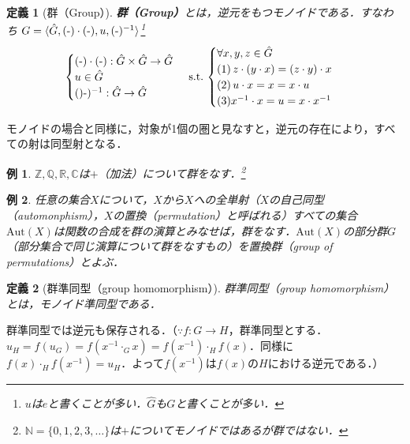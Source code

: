 \documentclass[dvipdfmx,a4j,10pt]{jsarticle}
\theoremstyle{mystyle1}
\theoremstyle{mystyle2}
\newtheorem{dfn*}{定義}
\newtheorem{example}{例}
\begin{document}
\begin{dfn*}[群（Group）]
    \textbf{群（Group）}とは，逆元をもつモノイドである．すなわち
    $G=\langle \hat{G},(\mathchar`-)\cdot (\mathchar`-),u,(\mathchar`-)^{-1} \rangle$\footnote{$u$は$e$と書くことが多い．$\hat G$も$G$と書くことが多い．}\\
    \[
        \begin{cases}
            (\mathchar`-)\cdot(\mathchar`-):\hat{G}\times\hat{G}\to\hat{G} \\
            u\in\hat{G}                                                    \\
            ()\mathchar`-)^{-1}:\hat{G}\to\hat{G}
        \end{cases}\,\textrm{s.t.}\,
        \begin{cases}
            \forall x,y,z\in\hat{G}                          \\
            \textrm{(1)}\,z\cdot(y\cdot x)=(z\cdot y)\cdot x \\
            \textrm{(2)}\, u\cdot x=x=x\cdot u               \\
            \textrm{(3)} x^{-1}\cdot x=u=x\cdot x^{-1}
        \end{cases}
    \]
\end{dfn*}

モノイドの場合と同様に，対象が1個の圏と見なすと，逆元の存在により，すべての射は同型射となる．

\begin{example}
    $\mathbb{Z},\mathbb{Q},\mathbb{R},\mathbb{C}$は$+$（加法）について群をなす．\footnote{$\mathbb{N}=\{0,1,2,3,\ldots\}$は$+$についてモノイドではあるが群ではない．}
\end{example}

\begin{example}
    任意の集合$X$について，$X$から$X$への全単射（$X$の自己同型（automonphism），$X$の置換（permutation）と呼ばれる）すべての集合$\mathrm{Aut}(X)$は関数の合成を群の演算とみなせば，群をなす．$\mathrm{Aut}(X)$の部分群$G$（部分集合で同じ演算について群をなすもの）を置換群（group of permutations）とよぶ．
\end{example}

\begin{dfn*}[群準同型（group homomorphism）]
    群準同型（group homomorphism）とは，モノイド準同型である．
\end{dfn*}

群準同型では逆元も保存される．（$\because$$f:G\to H$，群準同型とする．$u_H=f(u_G)=f(x^{-1}\cdot_G x)=f(x^{-1})\cdot_H f(x)$．同様に$f(x)\cdot_H f(x^{-1})=u_H$．よって$f(x^{-1})$は$f(x)$の$H$における逆元である．）
\end{document}
